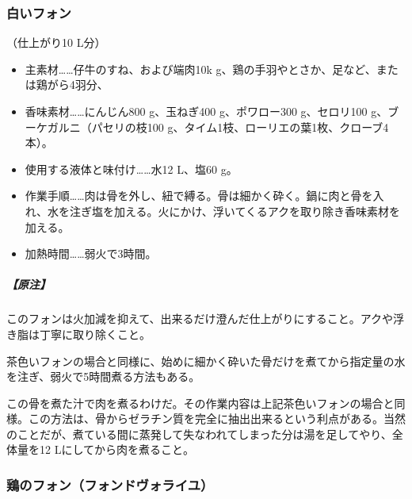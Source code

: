 \begin{recette}
\atoaki{}

\hypertarget{fonds-blanc-ordinaire}{%
\subsubsection{白いフォン}\label{fonds-blanc-ordinaire}}


 

（仕上がり10 L分）

\begin{itemize}
\item
  主素材\ldots{}\ldots{}仔牛のすね、および端肉10k
  g、鶏の手羽やとさか、足など、または鶏がら4羽分、
\item
  香味素材\ldots{}\ldots{}にんじん800 g、玉ねぎ400 g、ポワロー300
  g、セロリ100 g、ブーケガルニ（パセリの枝100
  g、タイム1枝、ローリエの葉1枚、クローブ4本）。
\item
  使用する液体と味付け\ldots{}\ldots{}水12 L、塩60 g。
\item
  作業手順\ldots{}\ldots{}肉は骨を外し、紐で縛る。骨は細かく砕く。鍋に肉と骨を入れ、水を注ぎ塩を加える。火にかけ、浮いてくるアクを取り除き香味素材を加える。
\item
  加熱時間\ldots{}\ldots{}弱火で3時間。
\end{itemize}

\hypertarget{nota-fonds-blanc-ordinaire}{%
\subparagraph{【原注】}\label{nota-fonds-blanc-ordinaire}}

このフォンは火加減を抑えて、出来るだけ澄んだ仕上がりにすること。アクや浮き脂は丁寧に取り除くこと。

茶色いフォンの場合と同様に、始めに細かく砕いた骨だけを煮てから指定量の水を注ぎ、弱火で5時間煮る方法もある。

この骨を煮た汁で肉を煮るわけだ。その作業内容は上記茶色いフォンの場合と同様。この方法は、骨からゼラチン質を完全に抽出出来るという利点がある。当然のことだが、煮ている間に蒸発して失なわれてしまった分は湯を足してやり、全体量を12
Lにしてから肉を煮ること。

\atoaki{}

\hypertarget{fonds-de-volaille}{%
\subsubsection{鶏のフォン（フォンドヴォライユ）}\label{fonds-de-volaille}}


\end{recette}
